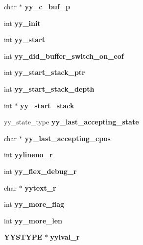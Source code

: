 \begin{DoxyCompactItemize}
\item 
char $\ast$ {\bfseries yy\-\_\-c\-\_\-buf\-\_\-p}\label{structyyguts__t_ab1b9bcacb33aab1e02b625512bc0e221}

\item 
int {\bfseries yy\-\_\-init}\label{structyyguts__t_abbef56b2d8359f6a15629c104f5dd030}

\item 
int {\bfseries yy\-\_\-start}\label{structyyguts__t_a8baf7d47fe53035d9bc2a9670795ff01}

\item 
int {\bfseries yy\-\_\-did\-\_\-buffer\-\_\-switch\-\_\-on\-\_\-eof}\label{structyyguts__t_a2daec411627700709ef2fd927e69627d}

\item 
int {\bfseries yy\-\_\-start\-\_\-stack\-\_\-ptr}\label{structyyguts__t_ad9e132dacc2904a8ae76c64c72e33795}

\item 
int {\bfseries yy\-\_\-start\-\_\-stack\-\_\-depth}\label{structyyguts__t_a35bedf1c17debd766565b99c39132eb4}

\item 
int $\ast$ {\bfseries yy\-\_\-start\-\_\-stack}\label{structyyguts__t_af6e2e45a5fdba0f313c680b35da4292a}

\item 
yy\-\_\-state\-\_\-type {\bfseries yy\-\_\-last\-\_\-accepting\-\_\-state}\label{structyyguts__t_a84e01a3658729e9d69f79feb3faf1c99}

\item 
char $\ast$ {\bfseries yy\-\_\-last\-\_\-accepting\-\_\-cpos}\label{structyyguts__t_a46fb8d232ed375921af0b37caeeb67c4}

\item 
int {\bfseries yylineno\-\_\-r}\label{structyyguts__t_aa9f13776b8d311e847cc7d974d49af4c}

\item 
int {\bfseries yy\-\_\-flex\-\_\-debug\-\_\-r}\label{structyyguts__t_a5ad72d75ed6d693824fe7e02ce21118e}

\item 
char $\ast$ {\bfseries yytext\-\_\-r}\label{structyyguts__t_aebaa731ad6cbe2411d104925e5bb3f2c}

\item 
int {\bfseries yy\-\_\-more\-\_\-flag}\label{structyyguts__t_a664a72171cc3e720fcb8120af9b72883}

\item 
int {\bfseries yy\-\_\-more\-\_\-len}\label{structyyguts__t_a683563bf4cd73f25b4c7b78579c1330e}

\item 
{\bf Y\-Y\-S\-T\-Y\-P\-E} $\ast$ {\bfseries yylval\-\_\-r}\label{structyyguts__t_a55dbdcd46a36d34adcbfc29be44d10cf}

\end{DoxyCompactItemize}


